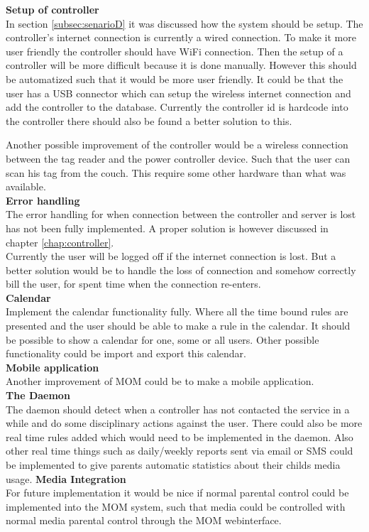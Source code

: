 \textbf{Setup of controller}\\
In section \vref{subsec:senarioD} it was discussed how the system should be setup. The controller's internet connection is currently a wired connection. To make it more user friendly the controller should have WiFi connection. Then the setup of a controller will be more difficult because it is done manually. However this should be automatized such that it would be more user friendly. It could be that the user has a USB connector which can setup the wireless internet connection and add the controller to the database. Currently the controller id is hardcode into the controller there should also be found a better solution to this. 

Another possible improvement of the controller would be a wireless connection between the tag reader and the power controller device. Such that the user can scan his tag from the couch. This require some other hardware than what was available.\\

\textbf{Error handling}\\
The error handling for when connection between the controller and server is lost has not been fully implemented. A proper solution is however discussed in chapter \vref{chap:controller}.\\
Currently the user will be logged off if the internet connection is lost. But a better solution would be to handle the loss of connection and somehow correctly bill the user, for spent time when the connection re-enters.\\

\textbf{Calendar}\\
Implement the calendar functionality fully. Where all the time bound rules are presented and the user should be able to make a rule in the calendar. It should be possible to show a calendar for one, some or all users. Other possible functionality could be import and export this calendar.\\

\textbf{Mobile application}\\
Another improvement of MOM could be to make a mobile application.\\

\textbf{The Daemon}\\
The daemon should detect when a controller has not contacted the service in a while and do some disciplinary actions against the user. There could also be more real time rules added which would need to be implemented in the daemon. Also other real time things such as daily/weekly reports sent via email or SMS could be implemented to give parents automatic statistics about their childs media usage. 
\newpage
\textbf{Media Integration}\\
For future implementation it would be nice if normal parental control could be implemented into the MOM system, such that media could be controlled with normal media parental control through the MOM webinterface.